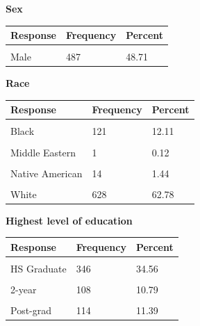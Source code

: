 \documentclass[]{article}
\begin{document}
\textbf{ Sex }

\begin{tabu} to 
\toprule
Response & Frequency & Percent\\
\midrule
{} &  & \\
Male & 487 & 48.71\\
\bottomrule
\end{tabu}

\textbf{ Race }

\begin{tabu} to 
\toprule
Response & Frequency & Percent\\
\midrule
{} &  & \\
Black & 121 & 12.11\\
 &  & \\
Middle Eastern & 1 & 0.12\\
 &  & \\
Native American & 14 & 1.44\\
 &  & \\
White & 628 & 62.78\\
\bottomrule
\end{tabu}

\textbf{ Highest level of education }

\begin{tabu} to 
\toprule
Response & Frequency & Percent\\
\midrule
{} &  & \\
HS Graduate & 346 & 34.56\\
 &  & \\
2-year & 108 & 10.79\\
 &  & \\
Post-grad & 114 & 11.39\\
\bottomrule
\end{tabu}
\end{document}

